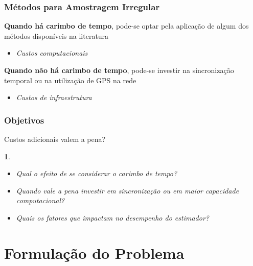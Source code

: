 \documentclass{beamer}
\newtheorem{definicao}{}
\begin{document}

\begin{frame}
	\frametitle{Métodos para Amostragem Irregular}
	
	\textbf{Quando há carimbo de tempo}, pode-se optar pela aplicação de algum dos métodos disponíveis na literatura
	\begin{itemize}
		\item \textit{Custos computacionais}
	\end{itemize}
	
	\vspace{0.5cm}
	
	\textbf{Quando não há carimbo de tempo}, pode-se investir na sincronização temporal ou na utilização de GPS na rede
	\begin{itemize}
		\item \textit{Custos de infraestrutura}
	\end{itemize}

\end{frame}


\begin{frame}
	\frametitle{Objetivos}
	
	Custos adicionais valem a pena?
	
	\begin{definicao}	
		\begin{itemize}
			\item Qual o efeito de se considerar o carimbo de tempo?
			\vspace{0.5cm}
			\item Quando vale a pena investir em sincronização ou em maior capacidade computacional?
			\vspace{0.5cm}
			\item Quais os fatores que impactam no desempenho do estimador?
		\end{itemize}
	\end{definicao}

\end{frame}


\section{Formulação do Problema} 
\end{document}
